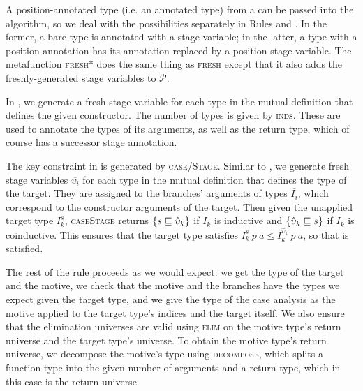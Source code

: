 \documentclass[nonacm,screen,10pt]{acmart}
\begin{document}
A position-annotated type (i.e. an annotated \corecursive type) from a \cofixpoint can be passed into the algorithm, so we deal with the possibilities separately in Rules  and . In the former, a bare \coinductive type is annotated with a stage variable; in the latter, a \coinductive type with a position annotation has its annotation replaced by a position stage variable. The metafunction \textsc{fresh*} does the same thing as \textsc{fresh} except that it also adds the freshly-generated stage variables to $\mathcal{P}$.

In , we generate a fresh stage variable for each \coinductive type in the mutual definition that defines the given constructor. The number of types is given by \textsc{inds}. These are used to annotate the types of its \coinductive arguments, as well as the return type, which of course has a successor stage annotation.

The key constraint in  is generated by \textsc{case\-/Stage}. Similar to , we generate fresh stage variables $\overline{\upsilon_i}$ for each \coinductive type in the mutual definition that defines the type of the target. They are assigned to the branches' arguments of types $\overline{I_i}$, which correspond to the constructor arguments of the target. Then given the unapplied target type $I_k^s$, \textsc{caseStage} returns $\{s \sqsubseteq \hat{\upsilon}_k\}$ if $I_k$ is inductive and $\{\hat{\upsilon}_k \sqsubseteq s\}$ if $I_k$ is coinductive. This ensures that the target type satisfies $I_k^s\ \overline{p}\ \overline{a} \leq I_k^{\hat{\upsilon}_k}\ \overline{p}\ \overline{a}$, so that  is satisfied.

The rest of the rule proceeds as we would expect: we get the type of the target and the motive, we check that the motive and the branches have the types we expect given the target type, and we give the type of the case analysis as the motive applied to the target type's indices and the target itself. We also ensure that the elimination universes are valid using \textsc{elim} on the motive type's return universe and the target type's universe. To obtain the motive type's return universe, we decompose the motive's type using \textsc{decompose}, which splits a function type into the given number of arguments and a return type, which in this case is the return universe.
\end{document}
